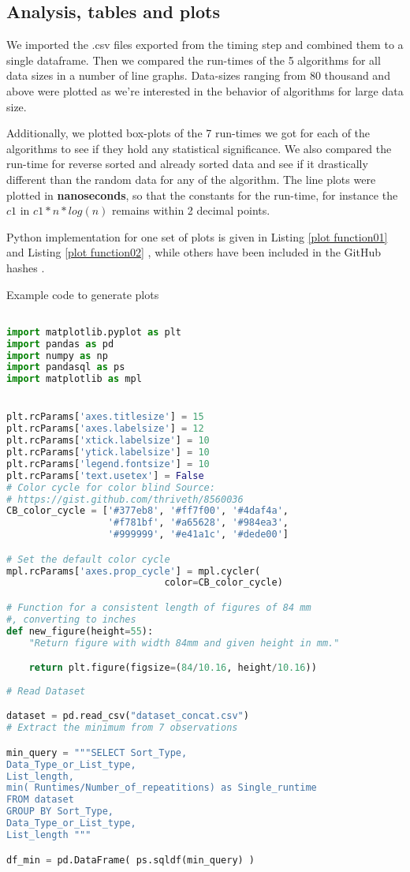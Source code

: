 \documentclass[sigconf, nonacm, natbib, screen, balance=False]{acmart}
\begin{document}
\subsection{Analysis, tables and plots}\label{sec:analysis}
We imported the .csv files exported from the timing step and combined them to a single dataframe. Then we compared the run-times of the 5 algorithms for all data sizes in a number of line graphs. Data-sizes ranging from 80 thousand and above were plotted as we're interested in the behavior of algorithms for large data size. 

Additionally, we plotted box-plots of the 7 run-times we got for each of the algorithms to see if they hold any statistical significance. We also compared the run-time for reverse sorted and already sorted data and see if it drastically different than the random data for any of the algorithm. The line plots were plotted in \textbf{nanoseconds}, so that the constants for the run-time, for instance the $c1$ in  $c1*n*log(n)$ remains within 2 decimal points.

Python implementation for one set of plots is given in Listing \ref{plot function01}  and Listing \ref{plot function02} , while others have been included in the GitHub hashes .

\begin{listing}
  \caption{Example code to generate plots}
  \label{plot function01}
\begin{lstlisting}[language=Python]

import matplotlib.pyplot as plt
import pandas as pd
import numpy as np
import pandasql as ps
import matplotlib as mpl


plt.rcParams['axes.titlesize'] = 15
plt.rcParams['axes.labelsize'] = 12
plt.rcParams['xtick.labelsize'] = 10
plt.rcParams['ytick.labelsize'] = 10
plt.rcParams['legend.fontsize'] = 10
plt.rcParams['text.usetex'] = False
# Color cycle for color blind Source:
# https://gist.github.com/thriveth/8560036
CB_color_cycle = ['#377eb8', '#ff7f00', '#4daf4a',
                  '#f781bf', '#a65628', '#984ea3',
                  '#999999', '#e41a1c', '#dede00']  

# Set the default color cycle
mpl.rcParams['axes.prop_cycle'] = mpl.cycler(
                            color=CB_color_cycle) 

# Function for a consistent length of figures of 84 mm
#, converting to inches
def new_figure(height=55):
    "Return figure with width 84mm and given height in mm."

    return plt.figure(figsize=(84/10.16, height/10.16))
    
# Read Dataset 

dataset = pd.read_csv("dataset_concat.csv")
# Extract the minimum from 7 observations

min_query = """SELECT Sort_Type, 
Data_Type_or_List_type,
List_length, 
min( Runtimes/Number_of_repeatitions) as Single_runtime
FROM dataset 
GROUP BY Sort_Type, 
Data_Type_or_List_type,
List_length """

df_min = pd.DataFrame( ps.sqldf(min_query) )
\end{lstlisting}
\end{listing}
\end{document}

